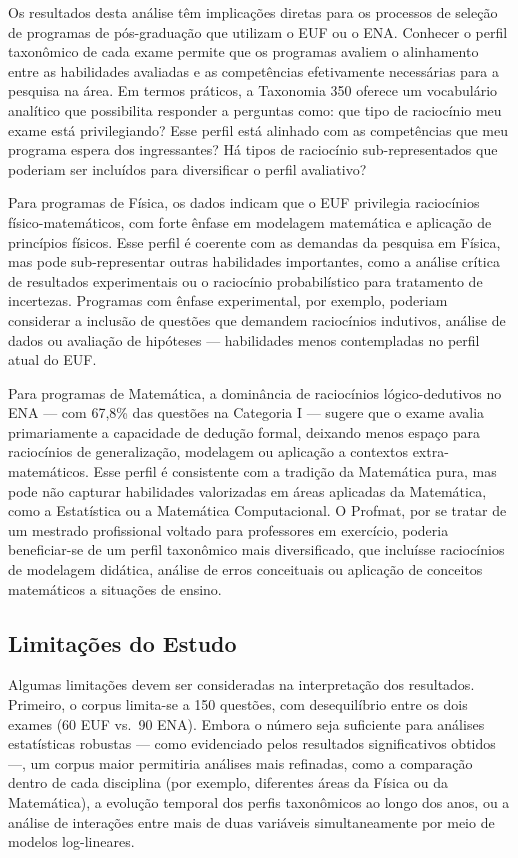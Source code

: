 \documentclass[
  12pt,
  a4paper,
  twoside,
  brazilian
]{article}
\begin{document}
Os resultados desta análise têm implicações diretas para os processos de
seleção de programas de pós-graduação que utilizam o EUF ou o ENA.
Conhecer o perfil taxonômico de cada exame permite que os programas
avaliem o alinhamento entre as habilidades avaliadas e as competências
efetivamente necessárias para a pesquisa na área. Em termos práticos, a
Taxonomia 350 oferece um vocabulário analítico que possibilita responder
a perguntas como: que tipo de raciocínio meu exame está privilegiando?
Esse perfil está alinhado com as competências que meu programa espera
dos ingressantes? Há tipos de raciocínio sub-representados que poderiam
ser incluídos para diversificar o perfil avaliativo?

Para programas de Física, os dados indicam que o EUF privilegia
raciocínios físico-matemáticos, com forte ênfase em modelagem matemática
e aplicação de princípios físicos. Esse perfil é coerente com as
demandas da pesquisa em Física, mas pode sub-representar outras
habilidades importantes, como a análise crítica de resultados
experimentais ou o raciocínio probabilístico para tratamento de
incertezas. Programas com ênfase experimental, por exemplo, poderiam
considerar a inclusão de questões que demandem raciocínios indutivos,
análise de dados ou avaliação de hipóteses --- habilidades menos
contempladas no perfil atual do EUF.

Para programas de Matemática, a dominância de raciocínios
lógico-dedutivos no ENA --- com 67,8\% das questões na Categoria I ---
sugere que o exame avalia primariamente a capacidade de dedução formal,
deixando menos espaço para raciocínios de generalização, modelagem ou
aplicação a contextos extra-matemáticos. Esse perfil é consistente com a
tradição da Matemática pura, mas pode não capturar habilidades
valorizadas em áreas aplicadas da Matemática, como a Estatística ou a
Matemática Computacional. O Profmat, por se tratar de um mestrado
profissional voltado para professores em exercício, poderia
beneficiar-se de um perfil taxonômico mais diversificado, que incluísse
raciocínios de modelagem didática, análise de erros conceituais ou
aplicação de conceitos matemáticos a situações de ensino.

\subsection{Limitações do Estudo}\label{limitauxe7uxf5es-do-estudo}

Algumas limitações devem ser consideradas na interpretação dos
resultados. Primeiro, o corpus limita-se a 150 questões, com
desequilíbrio entre os dois exames (60 EUF vs.~90 ENA). Embora o número
seja suficiente para análises estatísticas robustas --- como evidenciado
pelos resultados significativos obtidos ---, um corpus maior permitiria
análises mais refinadas, como a comparação dentro de cada disciplina
(por exemplo, diferentes áreas da Física ou da Matemática), a evolução
temporal dos perfis taxonômicos ao longo dos anos, ou a análise de
interações entre mais de duas variáveis simultaneamente por meio de
modelos log-lineares.
\end{document}

